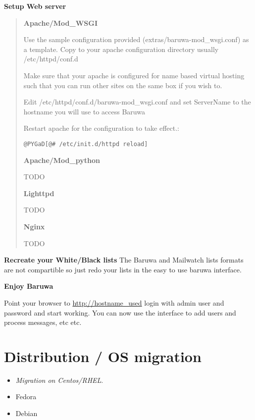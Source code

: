 \documentclass[a4paper,10pt,english]{manual}
\begin{document}
\textbf{Setup Web server}
\begin{quote}

\textbf{Apache/Mod\_WSGI}

Use the sample configuration provided (extras/baruwa-mod\_wsgi.conf)
as a template. Copy to your apache configuration directory usually
/etc/httpd/conf.d

Make sure that your apache is configured for name based virtual
hosting such that you can run other sites on the same box if you
wish to.

Edit /etc/httpd/conf.d/baruwa-mod\_wsgi.conf and set ServerName to
the hostname you will use to access Baruwa

Restart apache for the configuration to take effect.:

\begin{Verbatim}[commandchars=@\[\]]
@PYGaD[@# /etc/init.d/httpd reload]
\end{Verbatim}

\textbf{Apache/Mod\_python}

TODO

\textbf{Lighttpd}

TODO

\textbf{Nginx}

TODO
\end{quote}

\textbf{Recreate your White/Black lists}
The Baruwa and Mailwatch lists formats are not compartible so just redo your
lists in the easy to use baruwa interface.

\textbf{Enjoy Baruwa}

Point your browser to \href{http://hostname\_used}{http://hostname\_used} login with admin user and password
and start working. You can now use the interface to add users and process
messages, etc etc.


\section{Distribution / OS migration}
\begin{itemize}
\item {} 
\emph{Migration on Centos/RHEL}.

\item {} 
Fedora

\item {} 
Debian

\end{itemize}

\resetcurrentobjects
\hypertarget{--doc-users}{}
\end{document}
